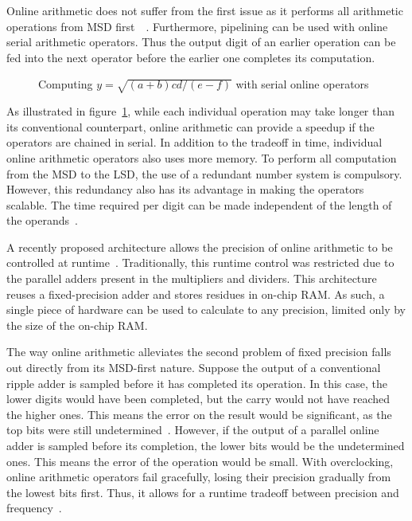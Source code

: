 Online arithmetic does not suffer from the first issue as it performs all
arithmetic operations from MSD first~\cite{Ercegovac1}~\cite{Ercegovac2}.
Furthermore, pipelining can be used with online serial arithmetic operators.
Thus the output digit of an earlier operation can be fed into the next
operator before the earlier one completes its computation.

\begin{figure}[H]
  \centering
  
  \caption{Computing $y=\sqrt{(a+b)cd/(e-f)}$ with serial online
           operators~\cite{Ercegovac1}}
  \label{Online}
\end{figure}

As illustrated in figure~\ref{Online}, while each individual operation may
take longer than its conventional counterpart, online arithmetic can provide
a speedup if the operators are chained in serial.
In addition to the tradeoff in time, individual online arithmetic operators
also uses more memory.
To perform all computation from the MSD to the LSD, the use of a
redundant number system is compulsory.
However, this redundancy also has its advantage in making the operators
scalable.
The time required per digit can be made independent of the length of the
operands~\cite{Trivedi1}.

A recently proposed architecture allows the precision of
online arithmetic to be controlled at runtime~\cite{Zhao1}.
Traditionally, this runtime control was restricted due to the parallel adders
present in the multipliers and dividers.
This architecture reuses a fixed-precision adder and stores residues in
on-chip RAM.
As such, a single piece of hardware can be used to calculate to any precision,
limited only by the size of the on-chip RAM.

The way online arithmetic alleviates the second problem of fixed precision
falls out directly from its MSD-first nature.
Suppose the output of a conventional ripple adder is sampled before
it has completed its operation.
In this case, the lower digits would have been completed, but the carry would
not have reached the higher ones.
This means the error on the result would be significant, as the top bits
were still undetermined~\cite{Shi1}.
However, if the output of a parallel online adder is sampled before its
completion, the lower bits would be the undetermined ones.
This means the error of the operation would be small.
With overclocking, online arithmetic operators fail gracefully, losing their
precision gradually from the lowest bits first.
Thus, it allows for a runtime tradeoff between precision and
frequency~\cite{Shi2}.

